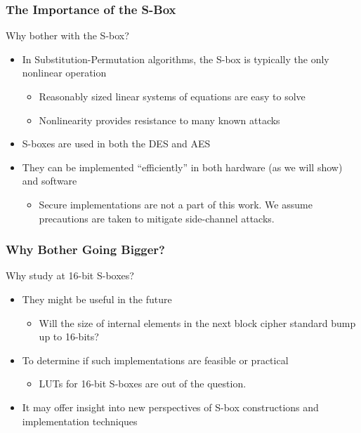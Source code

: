 \documentclass[10pt]{beamer}
\begin{document}
\begin{frame}
	\frametitle{The Importance of the S-Box}
	Why bother with the S-box?
	\begin{itemize}
		\item In Substitution-Permutation algorithms, the S-box is typically the only nonlinear operation
		\begin{itemize}
			\item Reasonably sized linear systems of equations are easy to solve
			\item Nonlinearity provides resistance to many known attacks
		\end{itemize}
		\pause
		\item S-boxes are used in both the DES and AES
		\pause
		\item They can be implemented ``efficiently'' in both hardware (as we will show) and software
		\begin{itemize}
			\item Secure implementations are not a part of this work. We assume precautions are taken to mitigate side-channel attacks.
		\end{itemize}
	\end{itemize}
\end{frame}

\begin{frame}
	\frametitle{Why Bother Going Bigger?}
	Why study at 16-bit S-boxes?
	\begin{itemize}
		\item They might be useful in the future
		\begin{itemize}
			\item Will the size of internal elements in the next block cipher standard bump up to 16-bits?
		\end{itemize}
		\pause
		\item To determine if such implementations are feasible or practical
		\begin{itemize}
			\item LUTs for 16-bit S-boxes are out of the question.
		\end{itemize}
		\pause
		\item It may offer insight into new perspectives of S-box constructions and implementation techniques
	\end{itemize}
\end{frame}
\end{document}
